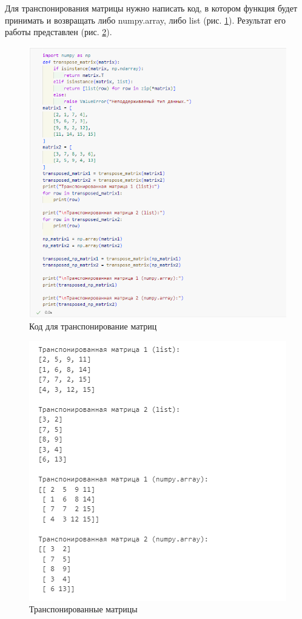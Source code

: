 \documentclass[14pt,a4paper]{extarticle}
\begin{document}
Для транспонирования матрицы нужно написать код, в котором
функция будет принимать и возвращать либо numpy.array, либо list (рис. \ref{pic:cod}).
Результат его работы представлен (рис. \ref{pic:rez}).
\begin{figure}[h!]
    \centering
    \includegraphics[scale=0.8]{pic7/cod.png}
    \caption{Код для транспонирование матриц}
    \label{pic:cod}
\end{figure}
\FloatBarrier
\begin{figure}[h!]
    \centering
    \includegraphics[scale=0.8]{pic7/rez.png}
    \caption{Транспонированные матрицы}
    \label{pic:rez}
\end{figure}
\FloatBarrier
\end{document}

